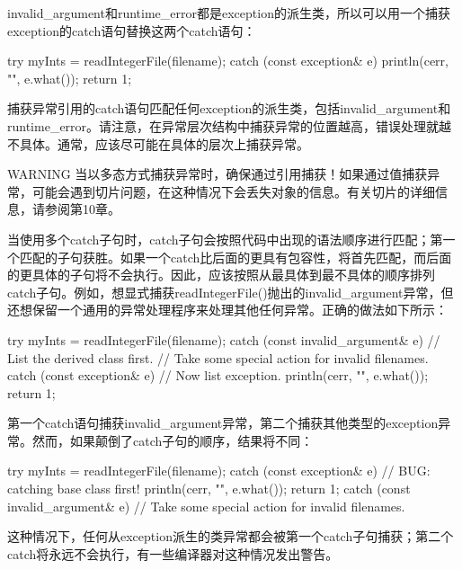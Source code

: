 invalid\_argument和runtime\_error都是exception的派生类，所以可以用一个捕获exception的catch语句替换这两个catch语句：

\begin{cpp}
try {
    myInts = readIntegerFile(filename);
} catch (const exception& e) {
    println(cerr, "{}", e.what());
    return 1;
}
\end{cpp}

捕获异常引用的catch语句匹配任何exception的派生类，包括invalid\_argument和runtime\_error。请注意，在异常层次结构中捕获异常的位置越高，错误处理就越不具体。通常，应该尽可能在具体的层次上捕获异常。

\begin{myWarning}{WARNING}
当以多态方式捕获异常时，确保通过引用捕获！如果通过值捕获异常，可能会遇到切片问题，在这种情况下会丢失对象的信息。有关切片的详细信息，请参阅第10章。
\end{myWarning}

当使用多个catch子句时，catch子句会按照代码中出现的语法顺序进行匹配；第一个匹配的子句获胜。如果一个catch比后面的更具有包容性，将首先匹配，而后面的更具体的子句将不会执行。因此，应该按照从最具体到最不具体的顺序排列catch子句。例如，想显式捕获readIntegerFile()抛出的invalid\_argument异常，但还想保留一个通用的异常处理程序来处理其他任何异常。正确的做法如下所示：

\begin{cpp}
try {
    myInts = readIntegerFile(filename);
} catch (const invalid_argument& e) { // List the derived class first.
    // Take some special action for invalid filenames.
} catch (const exception& e) { // Now list exception.
    println(cerr, "{}", e.what());
    return 1;
}
\end{cpp}

第一个catch语句捕获invalid\_argument异常，第二个捕获其他类型的exception异常。然而，如果颠倒了catch子句的顺序，结果将不同：

\begin{cpp}
try {
    myInts = readIntegerFile(filename);
} catch (const exception& e) { // BUG: catching base class first!
    println(cerr, "{}", e.what());
    return 1;
} catch (const invalid_argument& e) {
    // Take some special action for invalid filenames.
}
\end{cpp}

这种情况下，任何从exception派生的类异常都会被第一个catch子句捕获；第二个catch将永远不会执行，有一些编译器对这种情况发出警告。


